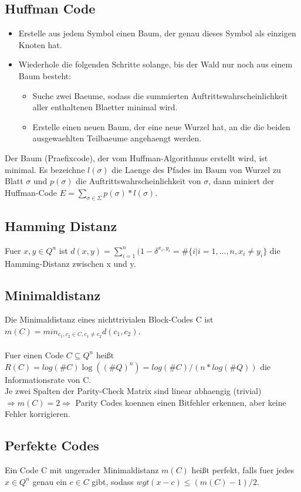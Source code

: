\documentclass[a4paper]{scrreprt}
\begin{document}
\subsection{Huffman Code}
\begin{itemize}
	\item Erstelle aus jedem Symbol einen Baum, der genau dieses Symbol als einzigen Knoten hat.
	\item Wiederhole die folgenden Schritte solange, bis der Wald nur noch aus einem Baum besteht:
		\begin{itemize}
			\item Suche zwei Baeume, sodass die summierten Auftrittswahrscheinlichkeit aller enthaltenen Blaetter minimal wird.
			\item Erstelle einen neuen Baum, der eine neue Wurzel hat, an die die beiden ausgewaehlten Teilbaeume angehaengt werden.
		\end{itemize}
\end{itemize}
Der Baum (Praefixcode), der vom Huffman-Algorithmus erstellt wird, ist minimal.
Es bezeichne $l(\sigma)$ die Laenge des Pfades im Baum von Wurzel zu Blatt $\sigma$ und $p(\sigma)$ die Auftrittswahrscheinlichkeit von $\sigma$, dann miniert der Huffman-Code $E = \sum_{\sigma \in \Sigma}p(\sigma)*l(\sigma)$.

\subsection{Hamming Distanz}
Fuer $x,y \in Q^n$ ist $d(x,y) = \sum_{i=1}^n(1-\delta^{x_i, y_i} = \#\{i|i = 1,...,n,x_i \neq y_i\}$ die Hamming-Distanz zwischen x und y.

\subsection{Minimaldistanz}
Die Minimaldistanz eines nichttrivialen Block-Codes C ist $m(C) = min_{c_1,c_2 \in C, c_1 \neq c_2}d(c_1, c_2)$.\\\\
Fuer einen Code $C \subseteq Q^n$ heißt $R(C) = log(\#C)\log((\#Q)^n) = log(\#C)/(n*log(\#Q))$ die Informationsrate von C.\\
Je zwei Spalten der Parity-Check Matrix sind linear abhaengig (trivial) $\Rightarrow m(C) = 2 \Rightarrow$ Parity Codes koennen einen Bitfehler erkennen, aber keine Fehler korrigieren.

\subsection{Perfekte Codes}
Ein Code C mit ungerader Minimaldistanz $m(C)$ heißt perfekt, falls fuer jedes $x \in Q^n$ genau ein $c \in C$ gibt, sodass $wgt(x-c) \le (m(C)-1)/2$.
\end{document}
